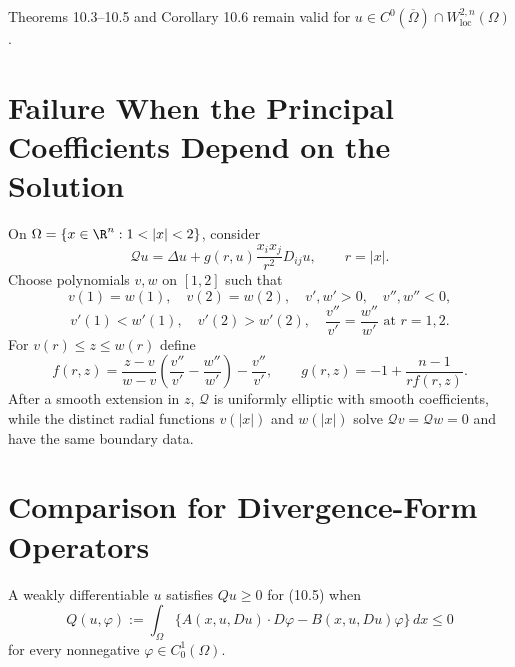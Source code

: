 Theorems 10.3--10.5 and Corollary 10.6 remain valid for
$u\in C^0(\overline\Omega)\cap W^{2,n}_{\mathrm{loc}}(\Omega)$.

\section{Failure When the Principal Coefficients Depend on the Solution}

\begin{example}
\label{gilbarg-trudinger.ex.10.3.solution-dependent-counterexample}
On $\Omega=\{x\in\R^n:1<|x|<2\}$, consider
\begin{equation}
\mathcal Qu=\Delta u+g(r,u)\frac{x_ix_j}{r^2}D_{ij}u,
\qquad r=|x|.
\tag{10.20}
\end{equation}
Choose polynomials $v,w$ on $[1,2]$ such that
\[
v(1)=w(1),\quad v(2)=w(2),\quad v',w'>0,\quad v'',w''<0,
\]
\[
v'(1)<w'(1),\quad v'(2)>w'(2),\quad
\frac{v''}{v'}=\frac{w''}{w'}\text{ at }r=1,2.
\]
For $v(r)\le z\le w(r)$ define
\[
f(r,z)=\frac{z-v}{w-v}
\left(\frac{v''}{v'}-\frac{w''}{w'}\right)-\frac{v''}{v'},
\qquad
g(r,z)=-1+\frac{n-1}{rf(r,z)}.
\]
After a smooth extension in $z$, $\mathcal Q$ is uniformly elliptic with
smooth coefficients, while the distinct radial functions $v(|x|)$ and
$w(|x|)$ solve $\mathcal Qv=\mathcal Qw=0$ and have the same boundary data.
\end{example}

\section{Comparison for Divergence-Form Operators}

A weakly differentiable $u$ satisfies $Qu\ge0$ for \textup{(10.5)} when
\begin{equation}
Q(u,\varphi):=\int_\Omega
\{A(x,u,Du)\cdot D\varphi-B(x,u,Du)\varphi\}\,dx\le0
\tag{10.21}
\end{equation}
for every nonnegative $\varphi\in C_0^1(\Omega)$.

